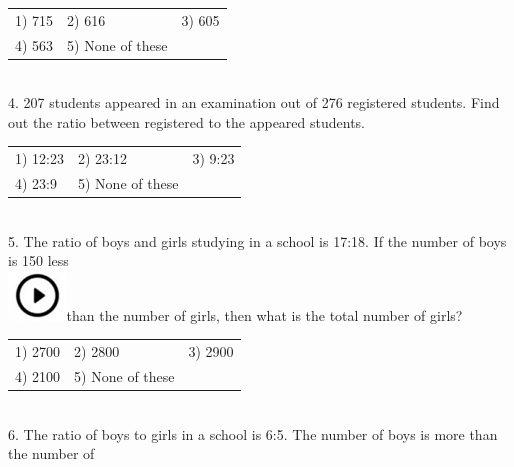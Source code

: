 \documentclass{article}
\begin{document}
	\noindent \begin{tabular}{p{1.7in} p{1.6in} p{1.6in}} \\ 
 1) 715                      &  2) 616               &  3) 605               \\
4) 563               & 5) None of these  \\
\end{tabular}
	
	\noindent 
	
	\noindent 
	
	\noindent 
	
	\noindent \\   4.   207 students appeared in an examination out of 276 registered students. Find out the ratio between registered to the appeared students.
	
	\noindent \begin{tabular}{p{1.7in} p{1.6in} p{1.6in}} \\ 
 1) 12:23                   &  2) 23:12            &  3) 9:23              \\
4) 23:9              & 5) None of these  \\
\end{tabular}
	
	\noindent  \\  
	
	5.   The ratio of boys and girls studying in a school is 17:18. If the number of boys is 150 less  
	\noindent \\ \includegraphics*[width=0.61in, height=0.52in]{images/image1}than the number of girls, then what is the total number of girls?
	
	\noindent \begin{tabular}{p{1.7in} p{1.6in} p{1.6in}} \\ 
 1) 2700                    &  2) 2800             &  3) 2900             \\
4) 2100             & 5) None of these  \\
\end{tabular}
	
	\noindent 
	
	\noindent 
	
	\noindent 
	
	\noindent \\   6.   The ratio of boys to girls in a school is 6:5. The number of boys is more than the number of
	
\end{document}
